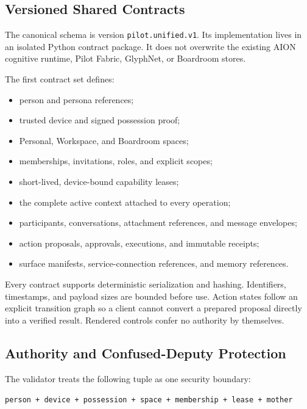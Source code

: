 \subsection{Versioned Shared Contracts}

The canonical schema is version \texttt{pilot.unified.v1}.  Its implementation lives in
an isolated Python contract package.  It does not overwrite the existing AION cognitive
runtime, Pilot Fabric, GlyphNet, or Boardroom stores.

The first contract set defines:

\begin{itemize}
  \item person and persona references;
  \item trusted device and signed possession proof;
  \item Personal, Workspace, and Boardroom spaces;
  \item memberships, invitations, roles, and explicit scopes;
  \item short-lived, device-bound capability leases;
  \item the complete active context attached to every operation;
  \item participants, conversations, attachment references, and message envelopes;
  \item action proposals, approvals, executions, and immutable receipts;
  \item surface manifests, service-connection references, and memory references.
\end{itemize}

Every contract supports deterministic serialization and hashing.  Identifiers, timestamps,
and payload sizes are bounded before use.  Action states follow an explicit transition
graph so a client cannot convert a prepared proposal directly into a verified result.
Rendered controls confer no authority by themselves.

\subsection{Authority and Confused-Deputy Protection}

The validator treats the following tuple as one security boundary:

\begin{center}
\texttt{person + device + possession + space + membership + lease + mother}
\end{center}

